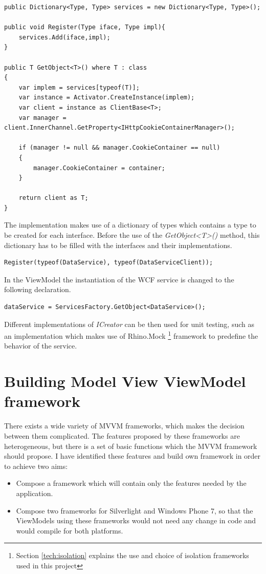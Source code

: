 \begin{verbatim}
public Dictionary<Type, Type> services = new Dictionary<Type, Type>();

public void Register(Type iface, Type impl){
    services.Add(iface,impl);
}

public T GetObject<T>() where T : class
{
    var implem = services[typeof(T)];
    var instance = Activator.CreateInstance(implem);
    var client = instance as ClientBase<T>;
    var manager = client.InnerChannel.GetProperty<IHttpCookieContainerManager>();
    
    if (manager != null && manager.CookieContainer == null)
    {
        manager.CookieContainer = container;
    }
    
    return client as T;
}
\end{verbatim}
The implementation makes use of a dictionary of types which contains a type to be created for each interface. Before the use of the \textit{GetObject<T>()} method, this dictionary has to be filled with the interfaces and their implementations.
\begin{verbatim}
Register(typeof(DataService), typeof(DataServiceClient));
\end{verbatim}
In the ViewModel the instantiation of the WCF service is changed to the following declaration.

\begin{verbatim}
dataService = ServicesFactory.GetObject<DataService>();
\end{verbatim}
Different implementations of \textit{ICreator} can be then used for unit testing, such as an implementation which makes use of Rhino.Mock \footnote{Section \ref{tech:isolation} explains the use and choice of isolation frameworks used in this project} framework to predefine the behavior of the service.

\section{Building Model View ViewModel framework}
There exists a wide variety of MVVM frameworks, which makes the decision between them complicated. The features proposed by these frameworks are heterogeneous, but there is a set of basic functions which the MVVM framework should propose. I have identified these features and build own framework in order to achieve two aims:

\begin{itemize}
	\item Compose a framework which will contain only the features needed by the application.
	\item Compose two frameworks for Silverlight and Windows Phone 7, so that the ViewModels using these frameworks would not need any change in code and would compile for both platforms.
\end{itemize}


